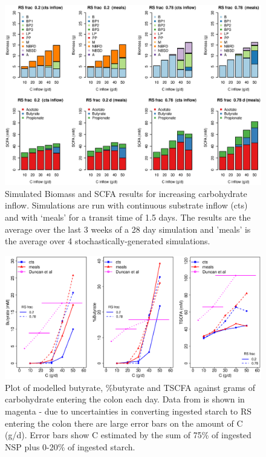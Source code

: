 \documentclass[a4paper]{article}
\begin{document}
\begin{figure}
    \centering
    \includegraphics[scale=0.4]{images/modelledDuncanExpt.eps}
    \caption{Simulated Biomass and SCFA results for increasing carbohydrate inflow. Simulations are run with continuous substrate inflow (cts) and with `meals' for a transit time of 1.5 days. The results are the average over the last 3 weeks of a 28 day simulation and 'meals' is the average over 4 stochastically-generated simulations. 
    }
    \label{fig:resultsDunc}
\end{figure}

\begin{figure}
    \centering
    \includegraphics[scale=0.3]{images/ButyrateCProteinExpt.eps}
    \caption{Plot of modelled butyrate, \%butyrate and TSCFA against grams of carbohydrate entering the colon each day. Data from \cite{duncan} is shown in magenta - due to uncertainties in converting ingested starch to RS entering the colon there are large error bars on the amount of C (g/d). Error bars show C estimated by the sum of 75\% of ingested NSP plus 0-20\% of ingested starch.
    }
    \label{fig:ButyrateVsCforPexpt}
\end{figure}
\end{document}
